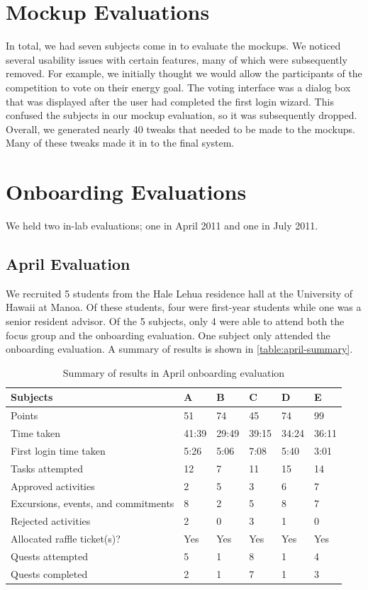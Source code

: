 \section{Mockup Evaluations}

In total, we had seven subjects come in to evaluate the mockups. We noticed several usability issues with certain features, many of which were subsequently removed. For example, we initially thought we would allow the participants of the competition to vote on their energy goal. The voting interface was a dialog box that was displayed after the user had completed the first login wizard. This confused the subjects in our mockup evaluation, so it was subsequently dropped. Overall, we generated nearly 40 tweaks that needed to be made to the mockups. Many of these tweaks made it in to the final system.

\section{Onboarding Evaluations}

We held two in-lab evaluations; one in April 2011 and one in July 2011.

\subsection{April Evaluation}

We recruited 5 students from the Hale Lehua residence hall at the University of Hawaii at Manoa. Of these students, four were first-year students while one was a senior resident advisor. Of the 5 subjects, only 4 were able to attend both the focus group and the onboarding evaluation. One subject only attended the onboarding evaluation. A summary of results is shown in \autoref{table:april-summary}.

\begin{table}[t]
	\begin{tabular}{| l || p{1cm} | p{1cm} | p{1cm} | p{1cm} | p{1cm} |}
		\hline
		Subjects & A & B & C & D & E \\
		\hline
		Points & 51 & 74 & 45 & 74 & 99 \\
		Time taken & 41:39 & 29:49 & 39:15 & 34:24 & 36:11 \\
		First login time taken & 5:26 & 5:06 & 7:08 & 5:40 & 3:01 \\
		Tasks attempted & 12 & 7 & 11 & 15 & 14 \\
		Approved activities & 2 & 5 & 3 & 6 & 7 \\
		Excursions, events, and commitments & 8 & 2 & 5 & 8 & 7 \\
		Rejected activities & 2 & 0 & 3 & 1 & 0 \\
		Allocated raffle ticket(s)? & Yes & Yes & Yes & Yes & Yes \\
		Quests attempted & 5 & 1 & 8 & 1 & 4 \\
		Quests completed & 2 & 1 & 7 & 1 & 3 \\
		\hline
	\end{tabular}
	\caption{Summary of results in April onboarding evaluation}
	\label{table:april-summary}
\end{table}

